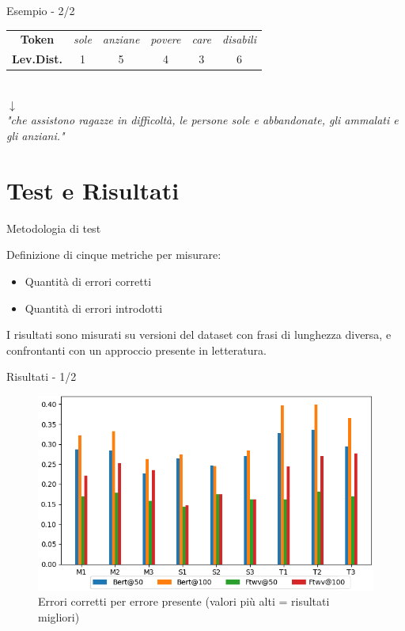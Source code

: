 \documentclass{beamer}
\begin{document}
\begin{frame}{Esempio - 2/2}
\begin{center}

\begin{tabular}{c|ccccc}
\textbf{Token} & \color{rossoPantano} \textit{sole} & \textit{anziane} & \textit{povere} & \textit{care} & \textit{disabili}\\
\textbf{Lev.Dist.} & \color{rossoPantano} 1 & 5 & 4 & 3 & 6 \\
\end{tabular}\ \\
$\downarrow$\\
\textit{"che assistono ragazze in difficoltà, le persone {\color{rossoPantano}sole}  e abbandonate, gli ammalati e gli anziani."}\\

\end{center}
\end{frame}



\section{Test e Risultati}

\begin{frame}{Metodologia di test}

Definizione di cinque metriche per misurare:
\begin{itemize}
\item Quantità di errori corretti
\item Quantità di errori introdotti
\end{itemize}
I risultati sono misurati su versioni del dataset con frasi di lunghezza diversa, e confrontanti con un approccio presente in letteratura.

\end{frame}
\begin{frame}{Risultati - 1/2}
\begin{figure}[H]
\includegraphics[width=.9\textwidth]{images/test/cp}
\caption{Errori corretti per errore presente (valori più alti = risultati migliori)}
\end{figure}
\end{frame}
\end{document}

